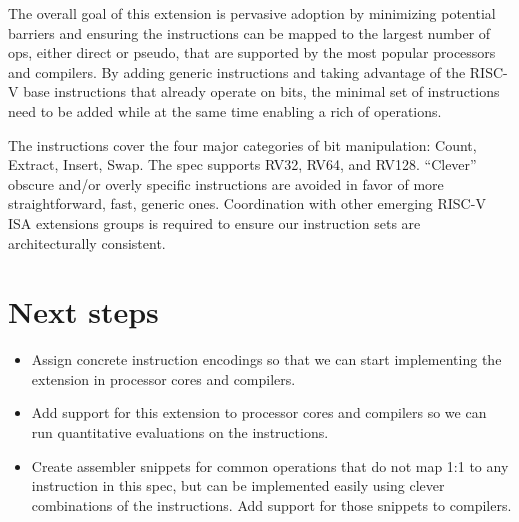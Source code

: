 The overall goal of this extension is pervasive adoption by minimizing
potential barriers and ensuring the instructions can be mapped to the
largest number of ops, either direct or pseudo, that are supported by
the most popular processors and compilers. By adding generic
instructions and taking advantage of the RISC-V base instructions that
already operate on bits, the minimal set of instructions need to be added
while at the same time enabling a rich of operations.

The instructions cover the four major categories of bit manipulation: Count,
Extract, Insert, Swap. The spec supports RV32, RV64, and RV128. ``Clever''
obscure and/or overly specific instructions are avoided in favor of more
straightforward, fast, generic ones.  Coordination with other emerging RISC-V
ISA extensions groups is required to ensure our instruction sets are
architecturally consistent.

\section{Next steps}

\begin{itemize}
\item
  Assign concrete instruction encodings so that we can start
  implementing the extension in processor cores and compilers.
\item
  Add support for this extension to processor cores and compilers
  so we can run quantitative evaluations on the instructions.
\item
  Create assembler snippets for common operations that do not map 1:1
  to any instruction in this spec, but can be implemented easily using
  clever combinations of the instructions. Add support for those snippets
  to compilers.
\end{itemize}
